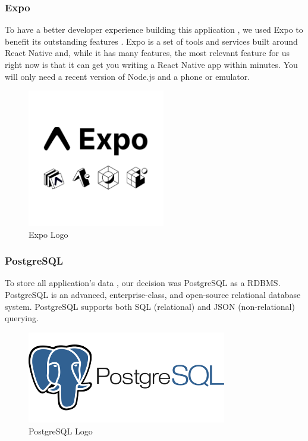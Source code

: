 \subsubsection*{Expo}
To have a better developer experience building this application , we used Expo to benefit its outstanding features .
Expo is a set of tools and services built around React Native and, while it has many features, the most relevant feature for us right now is that it can get you writing a React Native app within minutes. You will only need a recent version of Node.js and a phone or emulator. \cite{Expo}
\begin{figure}[H]
    \centering
    \includegraphics[height=6cm]{images/chap1/expo.png}
    \caption{Expo Logo}
    \label{fig:enter-label}
\end{figure}

\subsubsection*{PostgreSQL}
To store all application's data , our decision was PostgreSQL as a RDBMS. 
PostgreSQL is an advanced, enterprise-class, and open-source relational database system. PostgreSQL supports both SQL (relational) and JSON (non-relational) querying.\cite{PostgreSQL}
\begin{figure}[H]
    \centering
    \includegraphics[height=4cm]{images/chap1/postgres.png}
    \caption{PostgreSQL Logo}
    \label{fig:enter-label}
\end{figure}



